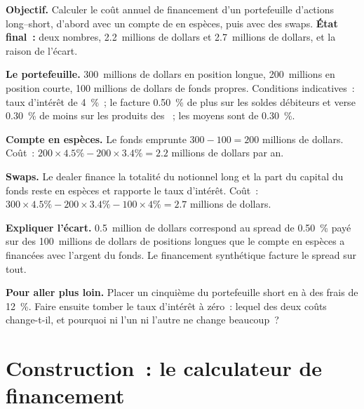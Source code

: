 \begin{tutorial}
\textbf{Objectif.} Calculer le coût annuel de financement d'un portefeuille d'actions long--short,
d'abord avec un compte de  en espèces, puis avec des swaps.
\textbf{État final~:} deux nombres, 2.2~millions de dollars et 2.7~millions de dollars, et la
raison de l'écart.
\begin{tutsteps}
\item \textbf{Le portefeuille.} 300~millions de dollars en position longue, 200~millions en position courte, 100
millions de dollars de fonds propres. Conditions indicatives~: taux d'intérêt de 4~\%~; le 
facture 0.50~\% de plus sur les soldes débiteurs et verse 0.30~\% de moins sur les produits
des ~; les  moyens sont de 0.30~\%.
\item \textbf{Compte en espèces.} Le fonds emprunte $300 - 100 = 200$ millions de dollars.
\label{lst:m1:financing:cash}
Coût~: $200 \times 4.5\% - 200 \times 3.4\% = 2.2$ millions de dollars par an.
\item \textbf{Swaps.} Le dealer finance la totalité du notionnel long et la
part du capital du fonds reste en espèces et rapporte le taux d'intérêt.
\label{lst:m1:financing:swap}
Coût~: $300 \times 4.5\% - 200 \times 3.4\% - 100 \times 4\% = 2.7$ millions de dollars.
\item \textbf{Expliquer l'écart.} 0.5~million de dollars correspond au spread de 0.50~\% payé sur
des 100~millions de dollars de positions longues que le compte en espèces a financées avec l'argent
du fonds. Le financement synthétique facture le spread sur tout.
\end{tutsteps}
\textbf{Pour aller plus loin.} Placer un cinquième du portefeuille short en 
à des frais de 12~\%. Faire ensuite tomber le taux d'intérêt à zéro~: lequel des
deux coûts change-t-il, et pourquoi ni l'un ni l'autre ne change beaucoup~?
\end{tutorial}

\section{Construction~: le calculateur de financement}\label{bld:m1:financing:calc}

